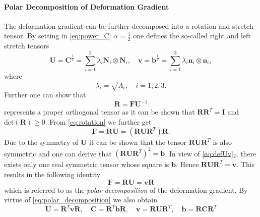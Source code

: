 \paragraph*{Polar Decomposition of Deformation Gradient} 
The deformation gradient can be further decomposed into a rotation and stretch tensor. By setting in \cref{eq:power_C} \(\alpha=\frac{1}{2}\) one defines the so-called right and left stretch tensors
\begin{equation}
    \mathbf{U} 
    = \mathbf{C}^{\frac{1}{2}} 
    = \sum_{i=1}^{3}  \lambda_{i} \bm{N}_{i} \otimes \bm{N}_{i}, \quad
    \mathbf{v} 
    = \mathbf{b}^{\frac{1}{2}} 
    = \sum_{i=1}^{3}  \lambda_{i} \bm{n}_{i} \otimes \bm{n}_{i},
    \label{eq:defUv}
\end{equation}
where 
\begin{equation}
    \lambda_{i} = \sqrt{\Lambda_{i}}, \quad i=1,2,3.
\end{equation}
Further one can show that 
\begin{equation}
    \mathbf{R} = \mathbf{F}\mathbf{U}^{-1}
    \label{eq:rotation}
\end{equation}
represents a proper orthogonal tensor as it can be shown that \(\mathbf{R}\mathbf{R}^{T}=\mathbf{I}\) and \(\text{det}(\mathbf{R}) \geq 0\). 
From \cref{eq:rotation} we further get
\begin{equation}
    \mathbf{F} 
    = \mathbf{R}\mathbf{U} 
    = (\mathbf{R}\mathbf{U}\mathbf{R}^{T})\mathbf{R}.
\end{equation}
Due to the symmetry of \(\mathbf{U}\) it can be shown that the tensor \(\mathbf{R}\mathbf{U}\mathbf{R}^{T}\) is also symmetric and one can derive that \((\mathbf{R}\mathbf{U}\mathbf{R}^{T})^{2} = \mathbf{b}\). In view of \cref{eq:defUv}{\({}_2\)}, there exists only one real symmetric tensor whose square is \(\mathbf{b}\). Hence \(\mathbf{R}\mathbf{U}\mathbf{R}^{T} = \mathbf{v}\). This results in the following identity
\begin{equation}
    \mathbf{F} 
    = \mathbf{R}\mathbf{U}
    = \mathbf{v}\mathbf{R}
    \label{eq:polar_decomposition}
\end{equation}
which is referred to as the \emph{polar decomposition} of the deformation gradient. By virtue of \cref{eq:polar_decomposition} we also obtain
\begin{equation}
    \mathbf{U} = \mathbf{R}^{T}\mathbf{v}\mathbf{R}, \quad
    \mathbf{C} = \mathbf{R}^{T}\mathbf{b}\mathbf{R}, \quad
    \mathbf{v} = \mathbf{R}\mathbf{U}\mathbf{R}^{T}, \quad
    \mathbf{b} = \mathbf{R}\mathbf{C}\mathbf{R}^{T}
    \label{eq:rotation_stretch_cauchy}
\end{equation}
